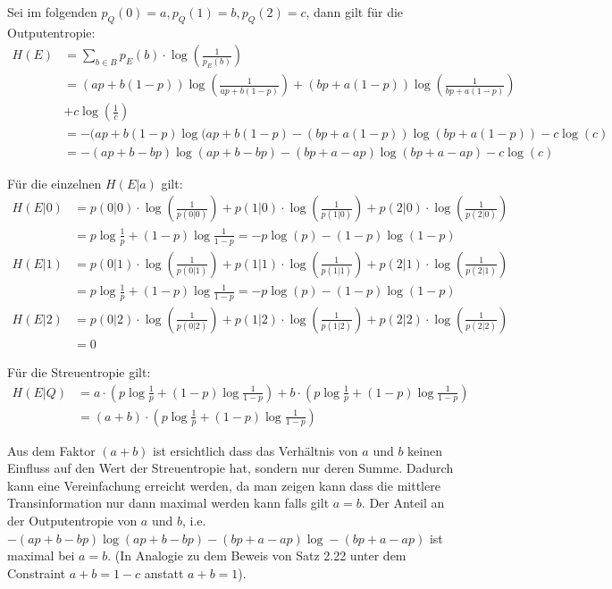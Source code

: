 \begin{myList}
Sei im folgenden $p_Q(0) = a, p_Q(1) = b, p_Q(2) = c$, dann gilt für die Outputentropie:
\begin{align*}
	H(E) &= \sum\limits_{b \in B} p_E(b) \cdot \log \left( \frac{1}{p_E(b)} \right)\\
	&= (ap + b(1-p))\log \left(\frac{1}{ap + b(1-p)}\right) + (bp + a(1-p))\log \left(\frac{1}{bp + a(1-p)}\right)\\
	&+ c \log\left( \frac{1}{c} \right) \\
	&= -(ap + b(1-p)\log(ap + b(1-p) - (bp + a(1-p))\log(bp + a(1-p)) - c\log(c) \\
	&= -(ap + b - bp)\log(ap + b - bp) -(bp + a - ap)\log(bp + a - ap) - c\log(c)
\end{align*}


Für die einzelnen $H(E|a)$ gilt:
\begin{align*}
	H(E|0) &= p(0|0) \cdot \log \left(\frac{1}{p(0|0)} \right) + p(1|0) \cdot \log \left(\frac{1}{p(1|0)} \right) + p(2|0) \cdot \log \left(\frac{1}{p(2|0)} \right)\\
	&= p\log \frac{1}{p} + (1-p) \log \frac{1}{1-p} = -p\log(p) - (1-p)\log(1-p)\\
	H(E|1) &= p(0|1) \cdot \log \left(\frac{1}{p(0|1)} \right) + p(1|1) \cdot \log \left(\frac{1}{p(1|1)} \right) + p(2|1) \cdot \log \left(\frac{1}{p(2|1)} \right)\\
	&= p\log \frac{1}{p} + (1-p) \log \frac{1}{1-p}= -p\log(p) - (1-p)\log(1-p)\\
	H(E|2) &= p(0|2) \cdot \log \left(\frac{1}{p(0|2)} \right) + p(1|2) \cdot \log \left(\frac{1}{p(1|2)} \right) + p(2|2) \cdot \log \left(\frac{1}{p(2|2)} \right) \\
	&= 0
\end{align*}

Für die Streuentropie gilt:
\begin{align*}
	H(E|Q) &= a \cdot \left(p\log \frac{1}{p} + (1-p) \log \frac{1}{1-p}\right) + b \cdot \left(p\log \frac{1}{p} + (1-p) \log \frac{1}{1-p} \right) \\
	&= (a+b) \cdot \left(p\log \frac{1}{p} + (1-p) \log \frac{1}{1-p} \right)
\end{align*}

Aus dem Faktor $(a+b)$ ist ersichtlich dass das Verhältnis von $a$ und $b$ keinen Einfluss auf den Wert der Streuentropie hat, sondern nur deren Summe.
Dadurch kann eine Vereinfachung erreicht werden, da man zeigen kann dass die mittlere Transinformation nur dann maximal werden kann falls gilt $a = b$.
Der Anteil an der Outputentropie von $a$ und $b$, i.e.  $-(ap + b - bp)\log(ap + b - bp) -(bp + a - ap)\log-(bp + a - ap)$ ist maximal bei $a = b$.
(In Analogie zu dem Beweis von Satz 2.22 unter dem Constraint $a + b = 1-c$ anstatt $a +b = 1$).


\end{myList}
